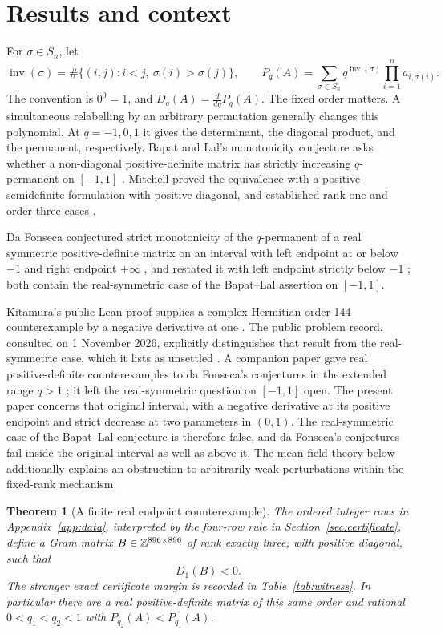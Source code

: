 \documentclass[11pt]{article}
\newtheorem{theorem}{Theorem}[section]
\theoremstyle{remark}\newtheorem{remark}[theorem]{Remark}
\newcommand{\inv}{\operatorname{inv}}
\newcommand{\Z}{\mathbb Z}
\begin{document}
\section{Results and context}

For $\sigma\in S_n$, let
\[
\inv(\sigma)=\#\{(i,j):i<j,\ \sigma(i)>\sigma(j)\},\qquad
P_q(A)=\sum_{\sigma\in S_n}q^{\inv(\sigma)}\prod_{i=1}^n a_{i,\sigma(i)}.
\]
The convention is $0^0=1$, and $D_q(A)=\frac{d}{dq}P_q(A)$.
The fixed order matters. A simultaneous relabelling by an arbitrary
permutation generally changes this polynomial.
At $q=-1,0,1$ it gives the determinant, the diagonal product, and the
permanent, respectively. Bapat and Lal's monotonicity conjecture asks
whether a non-diagonal positive-definite matrix has strictly increasing
$q$-permanent on $[-1,1]$ \cite{Bapat1992,BapatLal1994}.
Mitchell proved the equivalence with a positive-semidefinite formulation
with positive diagonal, and established rank-one and order-three cases
\cite{Mitchell2020}.

Da Fonseca conjectured strict monotonicity of the $q$-permanent of a
real symmetric positive-definite matrix on an interval with left
endpoint at or below $-1$ and right endpoint $+\infty$
\cite[Conjecture~1]{daFonseca2010}, and restated it with left endpoint
strictly below $-1$ \cite[Conjecture~2]{daFonseca2018}; both contain the
real-symmetric case of the Bapat--Lal assertion on $[-1,1]$.

Kitamura's public Lean proof supplies a complex Hermitian order-144
counterexample by a negative derivative at one \cite{Kitamura2026}.
The public problem record, consulted on 1 November 2026, explicitly
distinguishes that result from the real-symmetric case, which it lists
as unsettled \cite{OpenProblemsMI18}.
A companion paper gave real positive-definite counterexamples to da
Fonseca's conjectures in the extended range $q>1$
\cite{GoyalExtended2026}; it left the real-symmetric question on
$[-1,1]$ open. The present paper concerns that original interval,
with a negative derivative at its positive endpoint and strict decrease
at two parameters in $(0,1)$. The real-symmetric case of the Bapat--Lal
conjecture is therefore false, and da Fonseca's conjectures fail inside
the original interval as well as above it.
The mean-field theory below additionally explains an obstruction
to arbitrarily weak perturbations within the fixed-rank mechanism.

\begin{theorem}[A finite real endpoint counterexample]\label{thm:finite}
The ordered integer rows in Appendix~\ref{app:data}, interpreted by the
four-row rule in Section~\ref{sec:certificate}, define a Gram matrix
$B\in\Z^{\WitnessN\times\WitnessN}$ of rank exactly three, with positive
diagonal, such that
\[
 D_1(B)<0.
\]
The stronger exact certificate margin is recorded in
Table~\ref{tab:witness}. In particular there are a real positive-definite
matrix of this same order and rational $0<q_1<q_2<1$ with
$P_{q_2}(A)<P_{q_1}(A)$.
\end{theorem}
\end{document}
